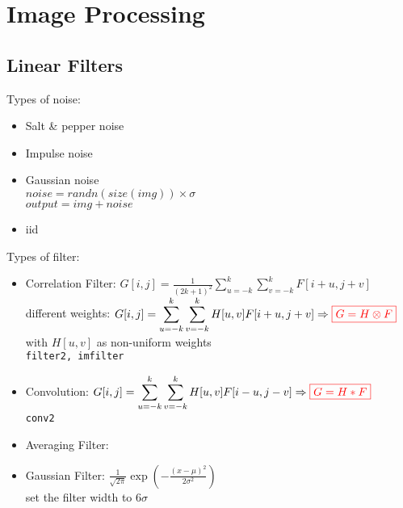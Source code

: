 \chapter{Image Processing}

\section{Linear Filters}
Types of noise:
\begin{itemize}
	\item Salt \& pepper noise
	\item Impulse noise
	\item Gaussian noise\\
	$noise = randn(size(img)) \times \sigma$\\
	$output = img + noise$
	\item {} \ac{iid}
\end{itemize}
Types of filter:
\begin{itemize}
	\item Correlation Filter: $\displaystyle G[i,j] = \frac{1}{(2k+1)^2} \sum_{u=-k}^{k} \sum_{v=-k}^{k} F[i+u, j+v] $\\
	different weights: $\displaystyle G[i,j] = \sum_{u=-k}^{k} \sum_{v=-k}^{k} H[u,v]F[i+u, j+v] \Rightarrow {\color{red} \boxed{G = H \otimes F}}$\\
	with $H[u,v]$ as non-uniform weights\\
	 \texttt{filter2, imfilter}
	\item Convolution: \tab $\displaystyle G[i,j] = \sum_{u=-k}^{k} \sum_{v=-k}^{k} H[u,v]F[i-u, j-v] \Rightarrow {\color{red} \boxed{G = H * F}}$\\
	 \texttt{conv2}\\
	\item Averaging Filter: 
	\item Gaussian Filter: $\displaystyle \frac{1}{\sqrt{2\pi}} \exp \left(-\frac{(x-\mu)^2}{2\sigma^2}\right)$\\
	 set the filter width to $6\sigma$\\
\end{itemize}

